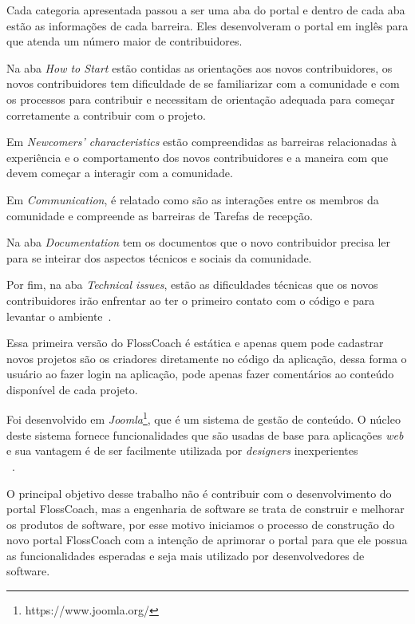 Cada categoria apresentada passou a ser uma aba do portal e dentro de cada aba 
estão as informações de cada barreira. Eles desenvolveram o portal em inglês
para que atenda um número maior de contribuidores.

Na aba \textit{How to Start} estão contidas as orientações aos novos contribuidores, os novos
contribuidores tem dificuldade de se familiarizar com a comunidade e com os processos
para contribuir e necessitam de orientação adequada para começar corretamente a
contribuir com o projeto.

Em \textit{Newcomers’ characteristics} estão 
compreendidas as barreiras relacionadas à experiência e o comportamento dos novos 
contribuidores e a maneira com que devem começar a interagir com a comunidade.

Em \textit{Communication}, é relatado como são as interações entre 
os membros da comunidade e compreende as barreiras de Tarefas de recepção.

Na aba \textit{Documentation} tem os documentos que o novo contribuidor precisa ler 
para se inteirar dos aspectos técnicos e sociais da comunidade.

Por fim, na aba \textit{Technical issues}, estão as dificuldades técnicas que os novos
contribuidores irão enfrentar ao ter o primeiro contato com o código e para levantar
o ambiente~\cite{steinmancher2015}.

Essa primeira versão do FlossCoach é estática e apenas quem pode cadastrar novos projetos 
são os criadores diretamente no código da aplicação, dessa forma o usuário ao fazer login
na aplicação, pode apenas fazer comentários ao conteúdo disponível de cada projeto.

Foi desenvolvido em \textit{Joomla}\footnote{https://www.joomla.org/}, que 
é um sistema de gestão de conteúdo. O núcleo deste sistema fornece funcionalidades que
são usadas de base para aplicações \textit{web} e sua vantagem é de ser facilmente 
utilizada por \textit{designers} inexperientes\\~\cite{Priefer:2016:JMD:2889160.2889176}.

O principal objetivo desse trabalho não é contribuir com o desenvolvimento do portal FlossCoach,
mas a engenharia de software se trata de construir e melhorar os produtos de software,
por esse motivo iniciamos o processo de construção do novo portal FlossCoach com
a intenção de aprimorar o portal para que ele possua as funcionalidades esperadas e 
seja mais utilizado por desenvolvedores de software.







